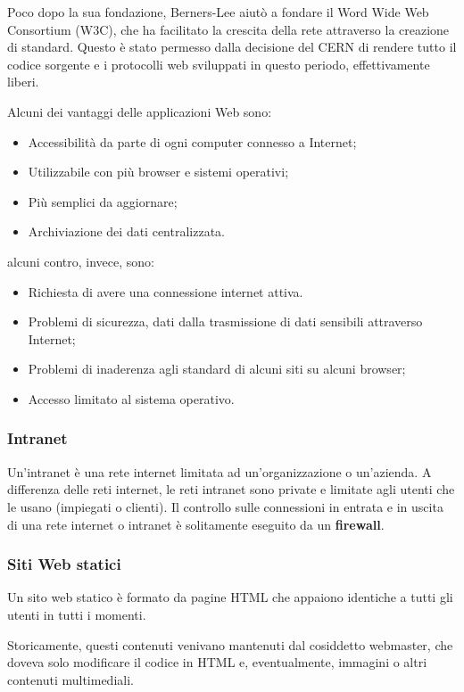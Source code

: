 \documentclass[a4paper,11pt]{article}
\begin{document}
Poco dopo la sua fondazione, Berners-Lee aiutò a fondare il Word Wide Web Consortium (W3C), che ha facilitato la crescita della rete attraverso la creazione di standard.
Questo è stato permesso dalla decisione del CERN di rendere tutto il codice sorgente e i protocolli web sviluppati in questo periodo, effettivamente liberi.

Alcuni dei vantaggi delle applicazioni Web sono:
\begin{itemize}
	\item Accessibilità da parte di ogni computer connesso a Internet;
	\item Utilizzabile con più browser e sistemi operativi;
	\item Più semplici da aggiornare;
	\item Archiviazione dei dati centralizzata.
\end{itemize}
alcuni contro, invece, sono:
\begin{itemize}
	\item Richiesta di avere una connessione internet attiva.
	\item Problemi di sicurezza, dati dalla trasmissione di dati sensibili attraverso Internet;
	\item Problemi di inaderenza agli standard di alcuni siti su alcuni browser;
	\item Accesso limitato al sistema operativo.
\end{itemize}

\subsubsection{Intranet}
Un'intranet è una rete internet limitata ad un'organizzazione o un'azienda.
A differenza delle reti internet, le reti intranet sono private e limitate agli utenti che le usano (impiegati o clienti).
Il controllo sulle connessioni in entrata e in uscita di una rete internet o intranet è solitamente eseguito da un \textbf{firewall}.

\subsubsection{Siti Web statici}
Un sito web statico è formato da pagine HTML che appaiono identiche a tutti gli utenti in tutti i momenti.

Storicamente, questi contenuti venivano mantenuti dal cosiddetto webmaster, che doveva solo modificare il codice in HTML e, eventualmente, immagini o altri contenuti multimediali.
\end{document}
